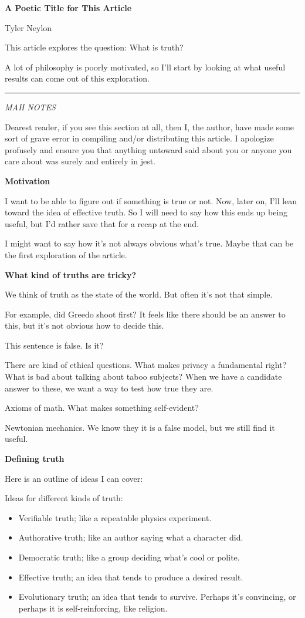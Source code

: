 \documentclass[11pt, oneside]{article}   	%
\begin{document}
{\bf A Poetic Title for This Article}

Tyler Neylon

\bigskip

This article explores the question: What is truth?

A lot of philosophy is poorly motivated, so I'll start by
looking at what useful results can come out of this exploration.

\bigskip
\hrule
\bigskip

{\em MAH NOTES}

Dearest reader, if you see this section at all, then I, the author,
have made some sort of grave error in compiling and/or distributing this
article. I apologize profusely and ensure you that anything untoward said
about you or anyone you care about was surely and entirely in jest.

{\bf Motivation}

I want to be able to figure out if something is true or not.
Now, later on, I'll lean toward the idea of effective truth.
So I will need to say how this ends up being useful, but I'd rather save
that for a recap at the end.

I might want to say how it's not always obvious what's true.
Maybe that can be the first exploration of the article.

{\bf What kind of truths are tricky?}

We think of truth as the state of the world. But often it's not that simple.

For example, did Greedo shoot first? It feels like there should be an answer to
this, but it's not obvious how to decide this.

This sentence is false. Is it?

There are kind of ethical questions.
What makes privacy a fundamental right?
What is bad about talking about taboo subjects?
When we have a candidate answer to these, we want a way to test how true they
are.

Axioms of math. What makes something self-evident?

Newtonian mechanics. We know they it is a false model, but we still find it
useful.

{\bf Defining truth}

Here is an outline of ideas I can cover:

Ideas for different kinds of truth:
\begin{itemize}
    \item Verifiable truth; like a repeatable physics experiment.
    \item Authorative truth; like an author saying what a character did.
    \item Democratic truth; like a group deciding what's cool or polite.
    \item Effective truth; an idea that tends to produce a desired result.
    \item Evolutionary truth; an idea that tends to survive.
          Perhaps it's convincing, or perhaps it is self-reinforcing, like
          religion.
\end{itemize}
\end{document}
